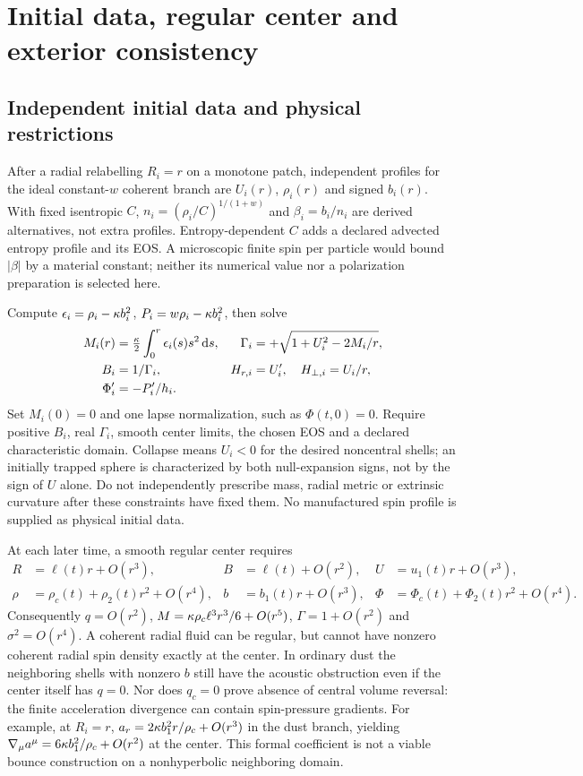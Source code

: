 \section{Initial data, regular center and exterior consistency}
\subsection{Independent initial data and physical restrictions}
After a radial relabelling $R_i=r$ on a monotone patch, independent profiles for the ideal constant-$w$ coherent branch are $U_i(r)$, $\rho_i(r)$ and signed $b_i(r)$. With fixed isentropic $C$, $n_i=(\rho_i/C)^{1/(1+w)}$ and $\beta_i=b_i/n_i$ are derived alternatives, not extra profiles. Entropy-dependent $C$ adds a declared advected entropy profile and its EOS. A microscopic finite spin per particle would bound $|\beta|$ by a material constant; neither its numerical value nor a polarization preparation is selected here.

Compute $\epsilon_i=\rho_i-\kappa b_i^2$, $P_i=w\rho_i-\kappa b_i^2$, then solve
\begin{align}
 M_i(r)&=\tfrac{\kappa}2\int_0^r\epsilon_i(s)s^2\,\mathrm d s,&
 \Gamma_i&=+\sqrt{1+U_i^2-2M_i/r},\\
 B_i&=1/\Gamma_i,&H_{r,i}&=U_i',\quad H_{\perp,i}=U_i/r,\\
 \Phi_i'&=-P_i'/h_i.
\end{align}
Set $M_i(0)=0$ and one lapse normalization, such as $\Phi(t,0)=0$. Require positive $B_i$, real $\Gamma_i$, smooth center limits, the chosen EOS and a declared characteristic domain. Collapse means $U_i<0$ for the desired noncentral shells; an initially trapped sphere is characterized by both null-expansion signs, not by the sign of $U$ alone. Do not independently prescribe mass, radial metric or extrinsic curvature after these constraints have fixed them. No manufactured spin profile is supplied as physical initial data.

At each later time, a smooth regular center requires
\begin{align}
 R&=\ell(t)r+O(r^3),& B&=\ell(t)+O(r^2),&
 U&=u_1(t)r+O(r^3),\\
 \rho&=\rho_c(t)+\rho_2(t)r^2+O(r^4),&
 b&=b_1(t)r+O(r^3),&
 \Phi&=\Phi_c(t)+\Phi_2(t)r^2+O(r^4).
\end{align}
Consequently $q=O(r^2)$, $M=\kappa\rho_c\ell^3r^3/6+O(r^5)$, $\Gamma=1+O(r^2)$ and $\sigma^2=O(r^4)$. A coherent radial fluid can be regular, but cannot have nonzero coherent radial spin density exactly at the center. In ordinary dust the neighboring shells with nonzero $b$ still have the acoustic obstruction even if the center itself has $q=0$. Nor does $q_c=0$ prove absence of central volume reversal: the finite acceleration divergence can contain spin-pressure gradients. For example, at $R_i=r$, $a_r=2\kappa b_1^2r/\rho_c+O(r^3)$ in the dust branch, yielding $\nabla_\mu a^\mu=6\kappa b_1^2/\rho_c+O(r^2)$ at the center. This formal coefficient is not a viable bounce construction on a nonhyperbolic neighboring domain.

